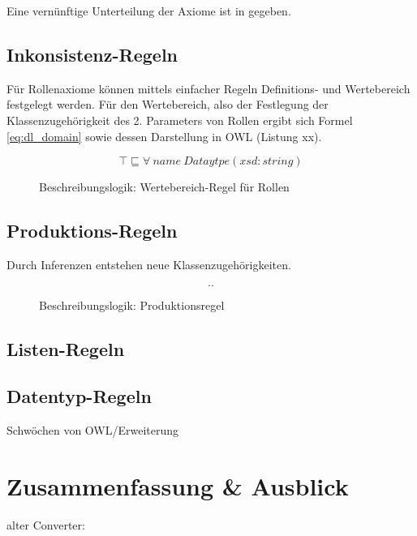 \documentclass[runningheads,a4paper]{llncs}
\begin{document}
Eine vernünftige Unterteilung der Axiome ist in \cite{owl2rif} gegeben. 


\subsection{Inkonsistenz-Regeln}

Für Rollenaxiome können mittels einfacher Regeln Definitions- und Wertebereich festgelegt werden. 
Für den Wertebereich, also der Festlegung der Klassenzugehörigkeit des 2. Parameters von Rollen ergibt sich Formel \eqref{eq:dl_domain} sowie dessen Darstellung in OWL (Listung xx).

\begin{figure}
\begin{equation}
\top \sqsubseteq \forall\ name\ Dataytpe(xsd:string)
\label{eq:dl_domain}
\end{equation}
\caption{Beschreibungslogik: Wertebereich-Regel für Rollen}
\end{figure}




\subsection{Produktions-Regeln}

Durch Inferenzen entstehen neue Klassenzugehörigkeiten. 
\begin{figure}
\begin{equation}
..
\label{eq:dl_infered}
\end{equation}
\caption{Beschreibungslogik: Produktionsregel}
\end{figure}



\subsection{Listen-Regeln}
\subsection{Datentyp-Regeln}




Schwöchen von OWL/Erweiterung

\section{Zusammenfassung \& Ausblick}
alter Converter:
\end{document}
